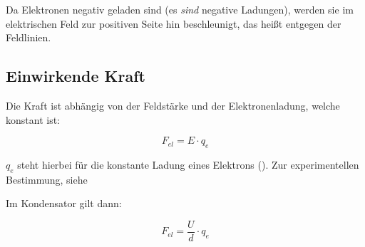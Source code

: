 




%
%	






Da Elektronen negativ geladen sind (es \emph{sind} negative Ladungen), werden sie im elektrischen Feld zur positiven Seite hin beschleunigt, das heißt entgegen der Feldlinien. 

\subsection{Einwirkende Kraft}

Die Kraft ist abhängig von der Feldstärke und der Elektronenladung, welche konstant ist:

\begin{equation}
	F_{el} = E \cdot q_e
\end{equation}

$q_e$ steht hierbei für die konstante Ladung eines Elektrons (). Zur experimentellen Bestimmung, siehe 

Im Kondensator gilt dann:

\begin{equation} \label{eq:F_el}
	F_{el} = \frac{U}{d} \cdot q_e
\end{equation}
